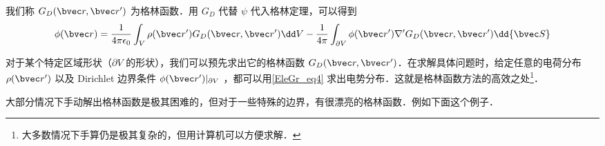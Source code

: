 我们称 $G_D(\bvec r,\bvec r')$ 为格林函数．用 $G_D$ 代替 $\psi$ 代入格林定理，可以得到
\begin{equation}\label{EleGr_eq4}
\phi(\bvec r)=\frac{1}{4\pi\epsilon_0}\int_V \rho(\bvec r')G_D(\bvec r,\bvec r')\dd V-\frac{1}{4\pi}\int_{\partial V} \phi(\bvec r')\nabla'G_D(\bvec r,\bvec r')\dd {\bvec S}
\end{equation}

对于某个特定区域形状（$\partial V$ 的形状），我们可以预先求出它的格林函数 $G_D(\bvec r,\bvec r')$．在求解具体问题时，给定任意的电荷分布 $\rho(\bvec r')$ 以及 Dirichlet 边界条件 $\phi(\bvec r')|_{\partial V}$ ，都可以用\autoref{EleGr_eq4} 求出电势分布．这就是格林函数方法的高效之处\footnote{大多数情况下手算仍是极其复杂的，但用计算机可以方便求解．}．

大部分情况下手动解出格林函数是极其困难的，但对于一些特殊的边界，有很漂亮的格林函数．例如下面这个例子．

